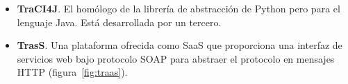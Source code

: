 \begin{itemize}
	\item \textbf{TraCI4J}. El homólogo de la librería de abstracción de Python pero para el lenguaje Java. Está desarrollada por un tercero.
	\item \textbf{TrasS}. Una plataforma ofrecida como SaaS que proporciona una interfaz de servicios web bajo protocolo SOAP para abstraer el protocolo en mensajes HTTP (figura~\ref{fig:traas}).
\end{itemize}
